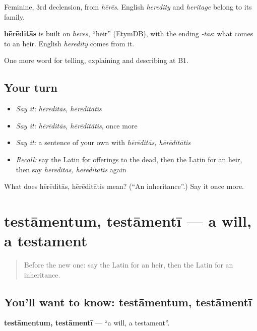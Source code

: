 Feminine, 3rd declension, from \emph{hērēs}. English \emph{heredity} and \emph{heritage} belong to its family.

\begin{cousinweb}
\textbf{hērēditās} is built on \emph{hērēs}, \textquotedblleft{}heir\textquotedblright{} (EtymDB), with the ending \emph{-tās}: what comes to an heir. English \emph{heredity} comes from it.
\end{cousinweb}

\begin{grammarlens}[title={What you've built}]
One more word for telling, explaining and describing at B1.
\end{grammarlens}

\subsection*{Your turn}
\begin{itemize}
\raggedright
  \item \emph{Say it:} \emph{hērēditās, hērēditātis}
  \item \emph{Say it:} \emph{hērēditās, hērēditātis}, once more
  \item \emph{Say it:} a sentence of your own with \emph{hērēditās, hērēditātis}
  \item \emph{Recall:} say the Latin for offerings to the dead, then the Latin for an heir, then say \emph{hērēditās, hērēditātis} again
\end{itemize}

\begin{tcolorbox}[breakable,colback=teal!4,colframe=teal!35!black,title={Before you move on}]
What does hērēditās, hērēditātis mean? (\textquotedblleft{}An inheritance\textquotedblright{}.) Say it once more.
\end{tcolorbox}
\section[testāmentum, testāmentī]{testāmentum, testāmentī — a will, a testament}

\label{lesson:LA-C332-testamentum}



\begin{quote}
Before the new one: say the Latin for an heir, then the Latin for an inheritance.
\end{quote}

\subsection*{You'll want to know: testāmentum, testāmentī}
\textbf{testāmentum, testāmentī} — \textquotedblleft{}a will, a testament\textquotedblright{}.


